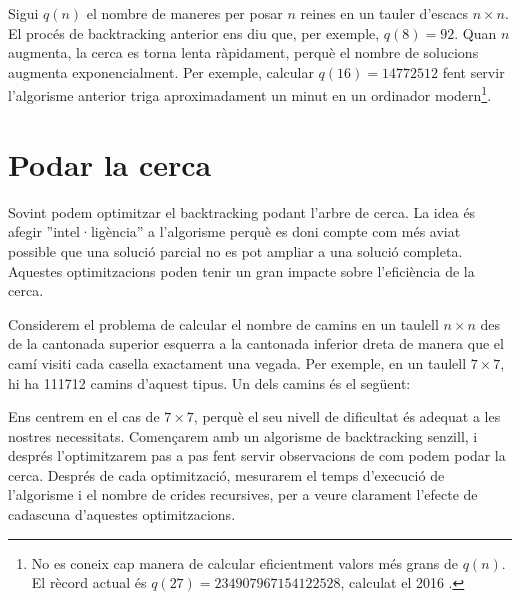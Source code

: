 Sigui $q(n)$ el nombre de maneres
per posar $n$ reines en un tauler d'escacs $n \times n$.
El procés de backtracking anterior
ens diu que, per exemple, $q(8)=92$.
Quan $n$ augmenta, la cerca es torna lenta ràpidament,
perquè el nombre de solucions augmenta
exponencialment.
Per exemple, calcular $q(16)=14772512$
fent servir l'algorisme anterior triga aproximadament un minut
en un ordinador modern\footnote{No es coneix cap manera de calcular
eficientment valors més grans de $q(n)$. El rècord actual és
$q(27)=234907967154122528$, calculat el 2016 \cite{q27}.}.

\section{Podar la cerca}

Sovint podem optimitzar el backtracking
podant l'arbre de cerca.
La idea és afegir ''intel·ligència'' a l'algorisme
perquè es doni compte com més aviat possible que una
solució parcial no es pot ampliar
a una solució completa.
Aquestes optimitzacions poden tenir un gran impacte
sobre l'eficiència de la cerca.

Considerem el problema
de calcular el nombre de camins
en un taulell $n \times n$ des de la cantonada superior esquerra
a la cantonada inferior dreta de manera que
el camí visiti cada casella exactament una vegada.
Per exemple, en un taulell $7 \times 7$,
hi ha 111712 camins d'aquest tipus.
Un dels camins és el següent:

\begin{center}
\end{center}

Ens centrem en el cas de $7 \times 7$,
perquè el seu nivell de dificultat és adequat a les nostres necessitats.
Començarem amb un algorisme de backtracking senzill,
i després l'optimitzarem pas a pas fent servir observacions
de com podem podar la cerca.
Després de cada optimització, mesurarem el temps d'execució
de l'algorisme i el nombre de crides recursives,
per a veure clarament l'efecte de cadascuna d'aquestes
optimitzacions.

